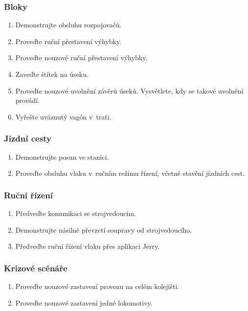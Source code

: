 \documentclass[12pt,a4paper]{article}
\begin{document}
\subsubsection*{Bloky}
\begin{enumerate}[leftmargin=*]
\item Demonstrujte obsluhu rozpojovačů.
\item Proveďte ruční přestavení výhybky.
\item Proveďte nouzové ruční přestavení výhybky.
\item Zaveďte štítek na úseku.
\item Proveďte nouzové uvolnění závěrů úseků. Vysvětlete, kdy se takové uvolnění
provádí.
\item Vyřešte uváznutý vagón v~trati.
\end{enumerate}

\subsubsection*{Jízdní cesty}
\begin{enumerate}[leftmargin=*]
\item Demonstrujte posun ve stanici.
\item Proveďte obsluhu vlaku v~ručním režimu řízení, včetně stavění jízdních
cest.
\end{enumerate}

\subsubsection*{Ruční řízení}
\begin{enumerate}[leftmargin=*]
\item Předveďte komunikaci se strojvedoucím.
\item Demonstrujte násilné převzetí soupravy od strojvedoucího.
\item Předveďte ruční řízení vlaku přes aplikaci Jerry.
\end{enumerate}

\subsubsection*{Krizové scénáře}
\begin{enumerate}[leftmargin=*]
\item Proveďte nouzové zastavení provozu na celém kolejišti.
\item Proveďte nouzové zastavení jedné lokomotivy.
\end{enumerate}
\end{document}

